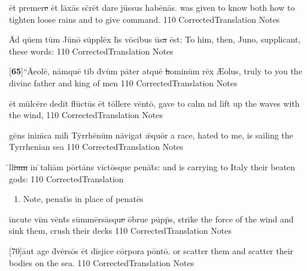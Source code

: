 \latline
  {\=et pr\-em\-er\sout{e }\=et l\=ax\={\macron a}s sc\={\macron {\i}}r\=et d\-ar\-e j\=uss\-us h\-ab\={\macron e}n\={\macron a}s.
}
  { was given to know both how to tighten loose rains and to give command. }
  {110}
  { CorrectedTranslation }
  { Notes }


\latline
  {\=Ad q\=uem t\=um J\={\macron u}n\={\macron o} s\=uppl\=ex h\={\macron {\i}}s v\={\macron o}c\-ib\-us \={\macron u}s\sout{a }\=est:
}
  { To him, then, Juno, supplicant, these words: }
  {110}
  { CorrectedTranslation }
  { Notes }


\latline
  {[\textbf{65}]``\=A\-e\-ol\=e, n\=amqu\=e t\-ib\-{\macron {\i}} d\={\macron {\i}}v\=um p\=at\-er \-atqu\=e\sout{ h}\-om\-in\=um r\={\macron e}x
}
  { {\AE}olus, truly to you the divine father and king of men }
  {110}
  { CorrectedTranslation }
  { Notes }


\latline
  {\=et m\=ulc\={\macron e}r\-e d\-ed\=it fl\={\macron u}ct\={\macron u}s \=et t\=oll\-er\-e v\=ent\={\macron o},
}
  { gave to calm nd lift up the waves with the wind, }
  {110}
  { CorrectedTranslation }
  { Notes }


\latline
  {g\={\macron e}ns \-in\-im\={\macron {\i}}c\-a m\-ih\={\macron {\i}} T\=yrrh\={\macron e}n\=um n\={\macron a}v\-ig\-at \={\ae}qu\=or
}
  { a race, hated to me, is sailing the Tyrrhenian sea }
  {110}
  { CorrectedTranslation }
  { Notes }



\latline
  {\={\macron {\i}}ll\sout{ium }\=in \={}t\-al\-i\=am p\=ort\={\macron a}ns v\=ict\={\macron o}squ\-e p\-en\={\macron a}t\={\macron {\i}}s:
}
  { and is carrying to Italy their beaten gods: }
  {110}
  { CorrectedTranslation }
  { \begin{enumerate}
  	\item Note, penat\={\i}s in place of penat\={e}s
  \end{enumerate} }


\latline
  {\=inc\-ut\-e v\=im v\=ent\={\macron {\i}}s s\=umm\=ers\={\macron a}squ\sout{e }\=obrue p\=upp\={\macron {\i}}s,
}
  { strike the force of the wind and sink them, crush their decks }
  {110}
  { CorrectedTranslation }
  { Notes }


\latline
  {[70]\={au}t \-ag\-e d\={\macron {\i}}v\=ers\={\macron o}s \=et d\=isj\-ic\-e c\=orp\-or\-a p\=ont\={\macron o}.
}
  { or scatter them and scatter their bodies on the sea. }
  {110}
  { CorrectedTranslation }
  { Notes }



